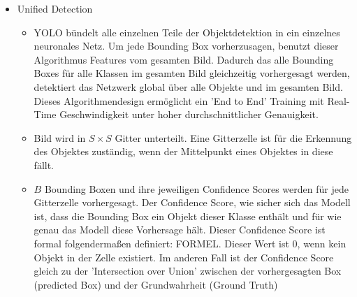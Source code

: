 {\begin{itemize}
\begin{itemize}
			\item Erstens: Performance; YOLO ist sehr schnell, da Framedetection als Regresssionsproblem verstanden wird, benötigt man keine komplizierte Pipeline. Das Neuronale Netz wird zum Testzeitpunkt auf ein neues Bild angewendet, um Objekte zu erkennen. YOLO erreicht mehr als das Doppelte der durchschnittlichen Genauigkeit anderer Echtzeitobjekterkennungssysteme (Real Time?)
			\item Zweitens: YOLO analysiert ein Bild global mit Vorhersagen zur Objekterkennung. Durch diese Gesamtbildanalyse kann YOLO während der Training- und Testzeit implizit kontextuelle Informationen über die Klassen und deren Aussehen sammeln. Die Anzahl der Fehler von YOLO beim Verwechselnl von Hintergrund und Objekten im Vordergrund ist weniger als halb so hoch wie bei Fast R-CNN, weil YOLO einen größeren Kontext hat
			\item Drittens: YOLO ist mit  generalisierte Repräsentationen von Objekten trainiert. Die Fehlertoleranz ist bei der Anwendung auf neue Bereiche und unerwartete Eingaben sehr viel größer, da es in hohem Maße verallgemeinerbar ist.
			\item Nachteil von YOLO ist die Genauigkeit. Es hat Schwierigkeiten einige Objekte, insbesondere kleinere, genau zu lokalisieren, obwohl es sonst sehr schnell ist.
			\item Die Trainingsdaten und der Quellcode von YOLO sind Open Source. Es sind außerdem mehrere vortrainierte Modelle zum Download verfügbar.
		\end{itemize}
		\item Unified Detection
		\begin{itemize}
			\item YOLO bündelt alle einzelnen Teile der Objektdetektion in ein einzelnes neuronales Netz. Um jede Bounding Box vorherzusagen, benutzt dieser Algorithmus Features vom gesamten Bild. Dadurch das alle Bounding Boxes für alle Klassen im gesamten Bild gleichzeitig vorhergesagt werden, detektiert das Netzwerk global über alle Objekte und im gesamten Bild. Dieses Algorithmendesign ermöglicht ein 'End to End' Training mit Real-Time Geschwindigkeit unter hoher durchschnittlicher Genauigkeit.
			\item Bild wird in $S \times S$ Gitter unterteilt. Eine Gitterzelle ist für die Erkennung des Objektes zuständig, wenn der Mittelpunkt eines Objektes in diese fällt.
			\item $B$ Bounding Boxen und  ihre jeweiligen Confidence Scores werden für jede Gitterzelle vorhergesagt. Der Confidence Score, wie sicher sich das Modell ist, dass die Bounding Box ein Objekt dieser Klasse enthält und für wie genau das Modell diese Vorhersage hält. Dieser Confidence Score ist formal folgendermaßen definiert: FORMEL. Dieser Wert ist 0, wenn kein Objekt in der Zelle existiert. Im anderen Fall ist der Confidence Score gleich zu der 'Intersection over Union' zwischen der vorhergesagten Box (predicted Box) und der Grundwahrheit (Ground Truth)

\end{itemize}
\end{itemize}}
